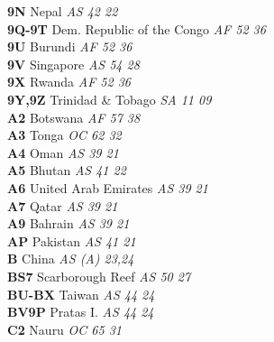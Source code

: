 ﻿\documentclass[landscape,a4paper]{article}
\begin{document}
\begin{multicols}{6}
\textbf{9N                      } Nepal                              \emph{ AS     42     22    } \\
\textbf{9Q-9T                   } Dem. Republic of the Congo         \emph{ AF     52     36    } \\
\textbf{9U                      } Burundi                            \emph{ AF     52     36    } \\
\textbf{9V                      } Singapore                          \emph{ AS     54     28    } \\
\textbf{9X                      } Rwanda                             \emph{ AF     52     36    } \\
\textbf{9Y,9Z                   } Trinidad \& Tobago                 \emph{ SA     11     09    } \\
\textbf{A2                      } Botswana                           \emph{ AF     57     38    } \\
\textbf{A3                      } Tonga                              \emph{ OC     62     32    } \\
\textbf{A4                      } Oman                               \emph{ AS     39     21    } \\
\textbf{A5                      } Bhutan                             \emph{ AS     41     22    } \\
\textbf{A6                      } United Arab Emirates               \emph{ AS     39     21    } \\
\textbf{A7                      } Qatar                              \emph{ AS     39     21    } \\
\textbf{A9                      } Bahrain                            \emph{ AS     39     21    } \\
\textbf{AP                      } Pakistan                           \emph{ AS     41     21    } \\
\textbf{B                       } China                              \emph{ AS     (A)    23,24 } \\
\textbf{BS7                     } Scarborough Reef                   \emph{ AS     50     27    } \\
\textbf{BU-BX                   } Taiwan                             \emph{ AS     44     24    } \\
\textbf{BV9P                    } Pratas I.                          \emph{ AS     44     24    } \\
\textbf{C2                      } Nauru                              \emph{ OC     65     31    } \\

\end{multicols}
\end{document}
